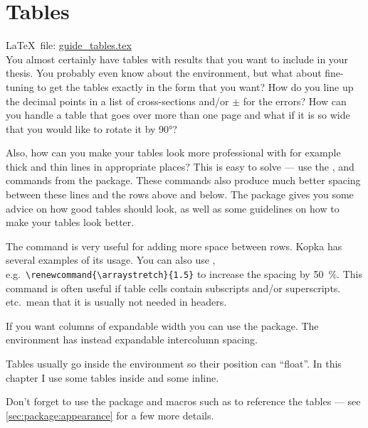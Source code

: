 
\chapter{Tables}%
\label{sec:table}

\LaTeX\ file: \href{run:./guide_tables.tex}{guide\_tables.tex}\\[1ex]
\noindent
You almost certainly have tables with results that you want to include
in your thesis. You probably even know about the 
environment, but what about fine-tuning to get the tables exactly in
the form that you want? How do you line up the decimal points in a
list of cross-sections and/or \(\pm\) for the errors? How can you
handle a table that goes over more than one page and what if it is so
wide that you would like to rotate it by \ang{90}?

Also, how can you make your tables look more professional with for
example thick and thin lines in appropriate places? This is easy to
solve --- use the ,  and 
commands from the  package. These commands also
produce much better spacing between these lines and the rows above and
below. The  package gives you some advice on how
good tables should look, as well as some guidelines on how to make your
tables look better.

The  command is very useful for adding more space between
rows. Kopka has several examples of its usage. You can also use
, e.g.\ \verb+\renewcommand{\arraystretch}{1.5}+ to
increase the spacing by \SI{50}{\percent}. This command is often useful if table
cells contain subscripts and/or superscripts. 
etc.\ mean that it is usually not needed in headers.

If you want columns of expandable width you can use the
 package. The environment  has instead
expandable intercolumn spacing.

Tables usually go inside the  environment so their position
can \enquote{float}. In this chapter I use some tables inside 
and some inline.

Don't forget to use the package  and macros such as 
to reference the tables --- see \cref{sec:package:appearance} for a few more details.

